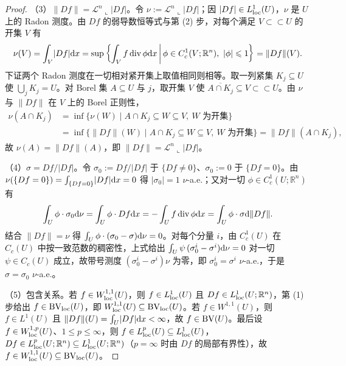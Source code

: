 \documentclass[../../main.tex]{subfiles}%
\begin{document}
\begin{proof}
（3）$\lVert Df\rVert=\mathcal{L}^n\llcorner\lvert Df\rvert$。令 $\nu:=\mathcal{L}^n\llcorner\lvert Df\rvert$；因 $\lvert Df\rvert\in L^1_{\mathrm{loc}}(U)$，$\nu$ 是 $U$ 上的 Radon 测度。由 $Df$ 的弱导数恒等式与第 (2) 步，对每个满足 $V\subset\subset U$ 的开集 $V$ 有
\begin{align*}
\nu(V)=\int_V\lvert Df\rvert\diff x=\sup\left\{\int_V f\diver\phi\diff x\,\middle|\,\phi\in C_c^1(V;\mathbb{R}^n),\ \lvert\phi\rvert\leqslant1\right\}=\lVert Df\rVert(V).
\end{align*}
下证两个 Radon 测度在一切相对紧开集上取值相同则相等。取一列紧集 $K_j\subseteq U$ 使 $\bigcup_{j}K_j=U$。对 Borel 集 $A\subseteq U$ 与 $j$，取开集 $V$ 使 $\overline{A\cap K_j}\subseteq V\subset\subset U$。由 $\nu$ 与 $\lVert Df\rVert$ 在 $V$ 上的 Borel 正则性，
\begin{align*}
\nu(A\cap K_j)&=\inf\{\nu(W)\mid A\cap K_j\subseteq W\subseteq V,\ W\text{ 为开集}\}\\
&=\inf\{\lVert Df\rVert(W)\mid A\cap K_j\subseteq W\subseteq V,\ W\text{ 为开集}\}=\lVert Df\rVert(A\cap K_j),
\end{align*}
故 $\nu(A)=\lVert Df\rVert(A)$，即 $\lVert Df\rVert=\mathcal{L}^n\llcorner\lvert Df\rvert$。

（4）$\sigma=Df/\lvert Df\rvert$。令 $\sigma_0:=Df/\lvert Df\rvert$ 于 $\{Df\neq0\}$、$\sigma_0:=0$ 于 $\{Df=0\}$。由 $\nu(\{Df=0\})=\int_{\{Df=0\}}\lvert Df\rvert\mathrm{d} x=0$ 得 $\lvert\sigma_0\rvert=1$ $\nu$-a.e.；又对一切 $\phi\in C_c^1(U;\mathbb{R}^n)$ 有
\begin{align*}
\int_U\phi\cdot\sigma_0\mathrm{d}\nu=\int_U\phi\cdot Df\mathrm{d} x=-\int_U f\operatorname{div}\phi\mathrm{d} x=\int_U\phi\cdot\sigma\mathrm{d}\lVert Df\rVert .
\end{align*}
结合 $\lVert Df\rVert=\nu$ 得 $\int_U\phi\cdot(\sigma_0-\sigma)\mathrm{d}\nu=0$。对每个分量 $i$，由 $C_c^1(U)$ 在 $C_c(U)$ 中按一致范数的稠密性，上式给出 $\int_U\psi\,(\sigma_0^i-\sigma^i)\mathrm{d}\nu=0$ 对一切 $\psi\in C_c(U)$ 成立，故带号测度 $(\sigma_0^i-\sigma^i)\nu$ 为零，即 $\sigma_0^i=\sigma^i$ $\nu$-a.e.，于是 $\sigma=\sigma_0$ $\nu$-a.e.。

（5）包含关系。若 $f\in W^{1,1}_{\mathrm{loc}}(U)$，则 $f\in L^1_{\mathrm{loc}}(U)$ 且 $Df\in L^1_{\mathrm{loc}}(U;\mathbb{R}^n)$，第 (1) 步给出 $f\in\mathrm{BV}_{\mathrm{loc}}(U)$，即 $W^{1,1}_{\mathrm{loc}}(U)\subseteq\mathrm{BV}_{\mathrm{loc}}(U)$。若 $f\in W^{1,1}(U)$，则 $f\in L^1(U)$ 且 $\lVert Df\rVert(U)=\int_U\lvert Df\rvert\mathrm{d} x<\infty$，故 $f\in\mathrm{BV}(U)$。最后设 $f\in W^{1,p}_{\mathrm{loc}}(U)$、$1\leqslant p\leqslant\infty$，则 $f\in L^p_{\mathrm{loc}}(U)\subseteq L^1_{\mathrm{loc}}(U)$，$Df\in L^p_{\mathrm{loc}}(U;\mathbb{R}^n)\subseteq L^1_{\mathrm{loc}}(U;\mathbb{R}^n)$（$p=\infty$ 时由 $Df$ 的局部有界性），故 $f\in W^{1,1}_{\mathrm{loc}}(U)\subseteq\mathrm{BV}_{\mathrm{loc}}(U)$。
\end{proof}
\end{document}
